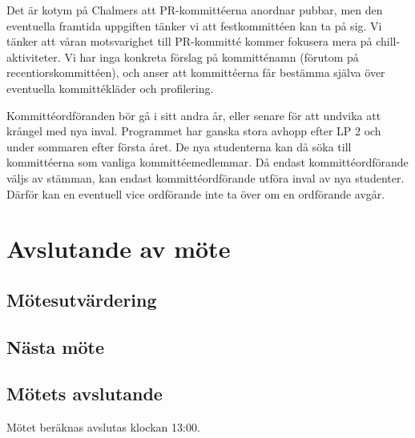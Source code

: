 \documentclass[protokoll]{dvd}
\begin{document}
Det är kotym på Chalmers att PR-kommittéerna anordnar pubbar, men den eventuella framtida uppgiften tänker vi att festkommittéen kan ta på sig.
Vi tänker att våran motsvarighet till PR-kommitté kommer fokusera mera på chill-aktiviteter.
Vi har inga konkreta förslag på kommitténamn (förutom på recentiorskommittéen), och anser att kommittéerna får bestämma själva över eventuella kommittékläder och profilering.

Kommittéordföranden bör gå i sitt andra år, eller senare för att undvika att krångel med nya inval.
Programmet har ganska stora avhopp efter LP 2 och under sommaren efter första året.
De nya studenterna kan då söka till kommittéerna som vanliga kommittéemedlemmar.
Då endast kommittéordförande väljs av stämman, kan endast kommittéordförande utföra inval av nya studenter.
Därför kan en eventuell vice ordförande inte ta över om en ordförande avgår.

\section{Avslutande av möte}

\subsection{Mötesutvärdering}

\subsection{Nästa möte}

\subsection{Mötets avslutande}

Mötet beräknas avslutas klockan 13:00.

\styrelsesignaturer
\end{document}
